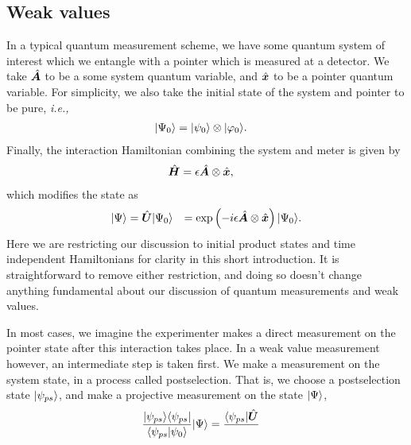 \subsection{Weak values}
In a typical quantum measurement scheme, we have some quantum system of interest which we entangle with a pointer which is measured at a detector.  We take $\hat{\bm A}$ to be a some system quantum variable, and $\hat{\bm x}$ to be a pointer quantum variable.  For simplicity, we also take the initial state of the system and pointer to be pure, \emph{i.e.,}
\begin{align}
  \lvert \Psi_0\rangle &= \lvert \psi_0\rangle \otimes \lvert \varphi_0\rangle.
\end{align}
Finally, the interaction Hamiltonian combining the system and meter is given by
\begin{align}
  \hat{\bm H} &= \epsilon \hat{\bm A} \otimes \hat{\bm x},
\end{align}
which modifies the state as
\begin{align}
  \lvert \Psi\rangle &= \hat{\bm U}\lvert \Psi_0\rangle
  &= \exp\left(-i\epsilon \hat{\bm A} \otimes \hat{\bm x} \right) \lvert \Psi_0\rangle.
\end{align}
Here we are restricting our discussion to initial product states and time independent Hamiltonians for clarity in this short introduction.  It is straightforward to remove either restriction, and doing so doesn't change anything fundamental about our discussion of quantum measurements and weak values.

In most cases, we imagine the experimenter makes a direct measurement on the pointer state after this interaction takes place.  In a weak value measurement however, an intermediate step is taken first.  We make a measurement on the system state, in a process called postselection.  That is, we choose a postselection state $\lvert \psi_{ps}\rangle$, and make a projective measurement on the state $\lvert \Psi\rangle$,
\begin{align}
 \frac{\lvert \psi_{ps}\rangle\langle \psi_{ps} \rvert}{\langle \psi_{ps} \vert \psi_0 \rangle} \lvert \Psi\rangle &= \frac{\langle \psi_{ps} \rvert\hat{\bm U}}{}
\end{align}



